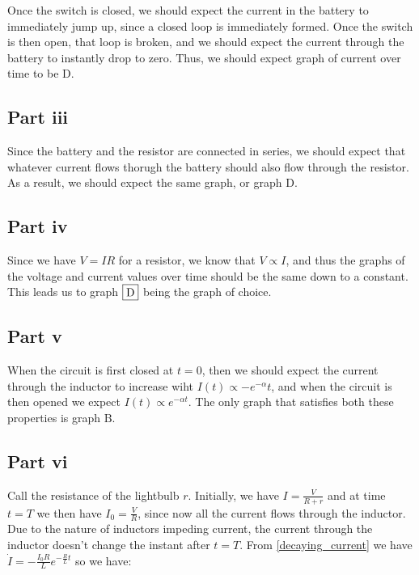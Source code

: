 \documentclass{article}
\theoremstyle{definition}
\numberwithin{equation}{section}
\numberwithin{definition}{section}
\begin{document}
Once the switch is closed, we should expect the current in the battery to immediately jump up, since a closed loop is immediately formed. Once the switch is then open, that loop is broken, and we should expect the current through the battery to instantly drop to zero. Thus, we should expect graph of current over time to be $\boxed{\text{D}}$. 

\subsection*{Part iii}

Since the battery and the resistor are connected in series, we should expect that whatever current flows thorugh the battery should also flow through the resistor. As a result, we should expect the same graph, or graph $\boxed{\text{D}}$.

\subsection*{Part iv}

Since we have $V = IR$ for a resistor, we know that $V \propto I$, and thus the graphs of the voltage and current values over time should be the same down to a constant. This leads us to graph $\boxed{\text D}$ being the graph of choice.

\subsection*{Part v}

When the circuit is first closed at $t = 0$, then we should expect the current through the inductor to increase wiht $I(t) \propto -e^{-\alpha}t$, and when the circuit is then opened we expect $I(t) \propto e^{-\alpha t}$. The only graph that satisfies both these properties is graph $\boxed{\text{B}}$.

\pagebreak
\subsection*{Part vi}

Call the resistance of the lightbulb $r$. Initially, we have $I = \frac{V}{R + r}$ and at time $t = T$ we then have $I_0 = \frac{V}{R}$, since now all the current flows through the inductor. Due to the nature of inductors impeding current, the current through the inductor doesn't change the instant after $t = T$. From \ref{decaying_current} we have $\dot I = -\frac{I_0R}{L}e^{-\frac{R}{L}t}$ so we have:
\end{document}
